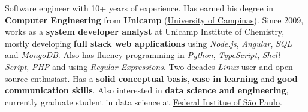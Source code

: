 

\begin{cvparagraph}

Software engineer with 10+ years of experience. Has earned his degree in \textbf{Computer Engineering} from \textbf{Unicamp} (\href{https://en.wikipedia.org/wiki/University_of_Campinas}{University of Campinas}). Since 2009, works as a \textbf{system developer analyst} at Unicamp Institute of Chemistry, mostly developing \textbf{full stack web applications} using \textit{Node.js}, \textit{Angular}, \textit{SQL} and \textit{MongoDB}. Also has fluency programming in \textit{Python}, \textit{TypeScript}, \textit{Shell Script}, \textit{PHP} and using \textit{Regular Expressions}. Two decades \textit{Linux} user and open source enthusiast. Has a \textbf{solid conceptual basis}, \textbf{ease in learning} and \textbf{good communication skills}. Also interested in \textbf{data science and engineering}, currently graduate student in data science at \href{https://en.wikipedia.org/wiki/Federal_Institute_of_S%C3%A3o_Paulo}{Federal Institue of São Paulo}.
\end{cvparagraph}
